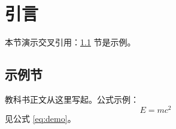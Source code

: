 \chapter{引言}
\label{ch:intro}

本节演示交叉引用：\ref{sec:example} 节是示例。

\section{示例节}
\label{sec:example}

教科书正文从这里写起。公式示例：
\begin{equation}
  E = mc^2 \label{eq:demo}
\end{equation}
见公式 \ref{eq:demo}。
